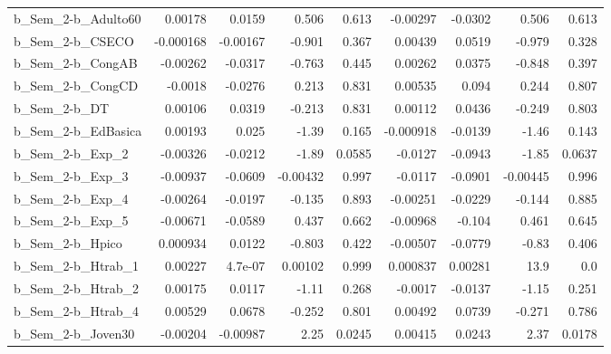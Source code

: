 \begin{tabular}{lrrrrrrrr}
b\_Sem\_2-b\_Adulto60         &     0.00178 &       0.0159 &    0.506 &    0.613 &   -0.00297 &     -0.0302 &        0.506 &         0.613 \\
b\_Sem\_2-b\_CSECO            &   -0.000168 &     -0.00167 &   -0.901 &    0.367 &    0.00439 &      0.0519 &       -0.979 &         0.328 \\
b\_Sem\_2-b\_CongAB           &    -0.00262 &      -0.0317 &   -0.763 &    0.445 &    0.00262 &      0.0375 &       -0.848 &         0.397 \\
b\_Sem\_2-b\_CongCD           &     -0.0018 &      -0.0276 &    0.213 &    0.831 &    0.00535 &       0.094 &        0.244 &         0.807 \\
b\_Sem\_2-b\_DT               &     0.00106 &       0.0319 &   -0.213 &    0.831 &    0.00112 &      0.0436 &       -0.249 &         0.803 \\
b\_Sem\_2-b\_EdBasica         &     0.00193 &        0.025 &    -1.39 &    0.165 &  -0.000918 &     -0.0139 &        -1.46 &         0.143 \\
b\_Sem\_2-b\_Exp\_2            &    -0.00326 &      -0.0212 &    -1.89 &   0.0585 &    -0.0127 &     -0.0943 &        -1.85 &        0.0637 \\
b\_Sem\_2-b\_Exp\_3            &    -0.00937 &      -0.0609 & -0.00432 &    0.997 &    -0.0117 &     -0.0901 &     -0.00445 &         0.996 \\
b\_Sem\_2-b\_Exp\_4            &    -0.00264 &      -0.0197 &   -0.135 &    0.893 &   -0.00251 &     -0.0229 &       -0.144 &         0.885 \\
b\_Sem\_2-b\_Exp\_5            &    -0.00671 &      -0.0589 &    0.437 &    0.662 &   -0.00968 &      -0.104 &        0.461 &         0.645 \\
b\_Sem\_2-b\_Hpico            &    0.000934 &       0.0122 &   -0.803 &    0.422 &   -0.00507 &     -0.0779 &        -0.83 &         0.406 \\
b\_Sem\_2-b\_Htrab\_1          &     0.00227 &      4.7e-07 &  0.00102 &    0.999 &   0.000837 &     0.00281 &         13.9 &           0.0 \\
b\_Sem\_2-b\_Htrab\_2          &     0.00175 &       0.0117 &    -1.11 &    0.268 &    -0.0017 &     -0.0137 &        -1.15 &         0.251 \\
b\_Sem\_2-b\_Htrab\_4          &     0.00529 &       0.0678 &   -0.252 &    0.801 &    0.00492 &      0.0739 &       -0.271 &         0.786 \\
b\_Sem\_2-b\_Joven30          &    -0.00204 &     -0.00987 &     2.25 &   0.0245 &    0.00415 &      0.0243 &         2.37 &        0.0178 \\

\end{tabular}
